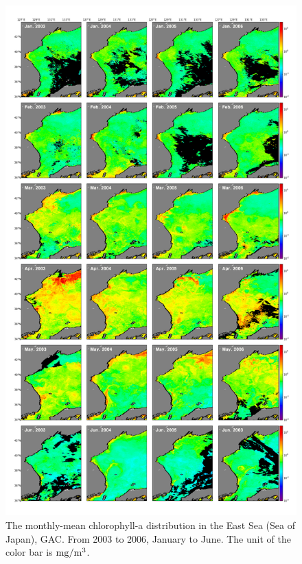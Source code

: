\begin{figure}
	\centering
	\includegraphics[width=0.8\linewidth]{../images/noname03}
	\caption{The monthly-mean chlorophyll-a distribution in the East Sea (Sea of Japan), GAC. From 2003 to 2006, January to June. The unit of the color bar is $\rm mg/m^3$.}
	\label{fig:noname03}
\end{figure}

